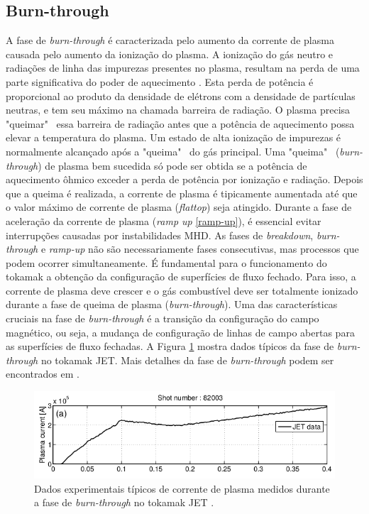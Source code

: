 \documentclass[12pt,oneside,a4paper]{abntex2}
\begin{document}
\subsection{Burn-through}
\label{burn-through}
\noindent A fase de \textit{burn-through} é caracterizada pelo aumento da corrente de plasma causada pelo aumento da ionização do plasma.
A ionização do gás neutro e radiações de linha das impurezas presentes no plasma, resultam na perda de uma parte significativa do poder de aquecimento \cite{breacdown, breacdown2}. Esta perda de potência é proporcional ao produto da densidade de elétrons com a densidade de partículas neutras, e tem seu máximo na chamada barreira de radiação. O plasma precisa "queimar" \ essa barreira de radiação antes que a potência de aquecimento possa elevar a temperatura do plasma. 
Um estado de alta ionização de impurezas é normalmente alcançado após a "queima" \ do gás principal. 
Uma "queima" \ (\textit{burn-through}) de plasma bem sucedida só pode ser obtida se a potência de aquecimento ôhmico exceder a perda de potência por ionização e radiação. 
Depois que a queima é realizada, a corrente de plasma é tipicamente aumentada até que o valor máximo de corrente de plasma (\textit{flattop}) seja atingido. 
Durante a fase de aceleração da corrente de plasma (\textit{ramp up} \ref{ramp-up}), é essencial evitar interrupções causadas por instabilidades MHD. 
As fases de \textit{breakdown}, \textit{burn-through} e \textit{ramp-up} não são necessariamente fases consecutivas, mas processos que podem ocorrer simultaneamente. 
É fundamental para o funcionamento do tokamak a obtenção da configuração de superfícies de fluxo fechado. Para isso, a corrente de plasma deve crescer e o gás combustível deve ser totalmente ionizado durante a fase de queima de plasma (\textit{burn-through}).
Uma das características cruciais na fase de \textit{burn-through} é a transição da configuração do campo magnético, ou seja, a mudança de configuração de linhas de campo abertas para as superfícies de fluxo fechadas. A Figura \ref{fig: burn-through} mostra dados típicos da fase de \textit{burn-through} no tokamak JET. Mais detalhes da fase de \textit{burn-through} podem ser encontrados em \cite{breacdown, kim2013plasma}.

\begin{figure}[h]
\centering
\includegraphics[scale=0.4]{burn-through-phase.png} 
\caption{Dados experimentais típicos de corrente de plasma medidos durante a fase de \textit{burn-through} no tokamak
JET \cite{kim2013physics}.}   
\label{fig: burn-through}
\end{figure}
\end{document}
